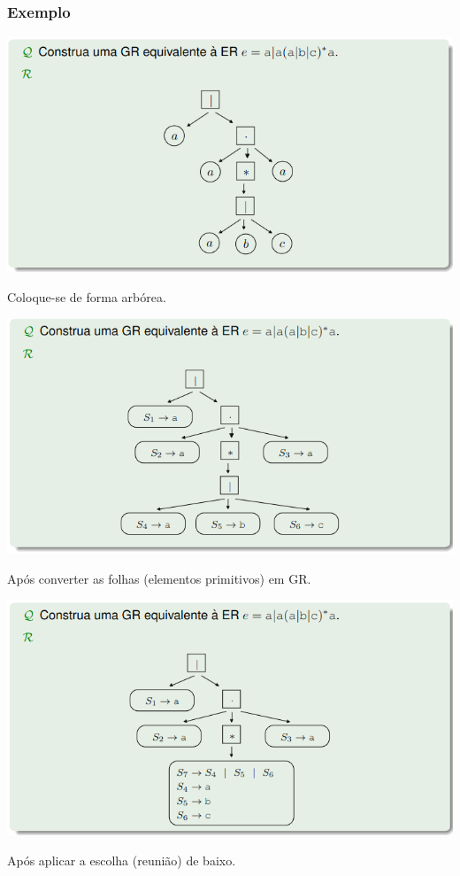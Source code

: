 \documentclass{article}
\begin{document}
\begin{flushleft}
  \subsubsection{Exemplo}

  \begin{center}
    \includegraphics[scale=0.4]{14}
  \end{center}
  \item Coloque-se de forma arbórea.

  \begin{center}
    \includegraphics[scale=0.4]{15}
  \end{center}
  \item Após converter as folhas (elementos primitivos) em GR.

  \begin{center}
    \includegraphics[scale=0.4]{16}
  \end{center}
  \item Após aplicar a escolha (reunião) de baixo.


\end{flushleft}
\end{document}
